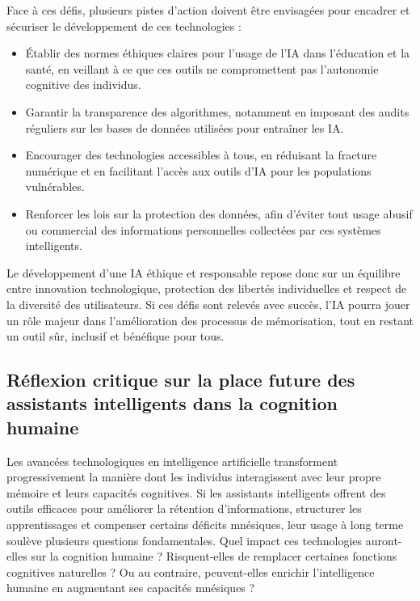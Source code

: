\documentclass[11pt,a4paper]{report}
\begin{document}
Face à ces défis, plusieurs pistes d’action doivent être envisagées pour encadrer et sécuriser le développement de ces technologies :

\begin{itemize}

    \item Établir des normes éthiques claires pour l’usage de l’IA dans l’éducation et la santé, en veillant à ce que ces outils ne compromettent pas l’autonomie cognitive des individus.

    \item Garantir la transparence des algorithmes, notamment en imposant des audits réguliers sur les bases de données utilisées pour entraîner les IA.

    \item Encourager des technologies accessibles à tous, en réduisant la fracture numérique et en facilitant l’accès aux outils d’IA pour les populations vulnérables.

    \item Renforcer les lois sur la protection des données, afin d’éviter tout usage abusif ou commercial des informations personnelles collectées par ces systèmes intelligents.

\end{itemize}

Le développement d’une IA éthique et responsable repose donc sur un équilibre entre innovation technologique, protection des libertés individuelles et respect de la diversité des utilisateurs. Si ces défis sont relevés avec succès, l’IA pourra jouer un rôle majeur dans l’amélioration des processus de mémorisation, tout en restant un outil sûr, inclusif et bénéfique pour tous.

\subsection{Réflexion critique sur la place future des assistants intelligents dans la cognition humaine}

Les avancées technologiques en intelligence artificielle transforment progressivement la manière dont les individus interagissent avec leur propre mémoire et leurs capacités cognitives. Si les assistants intelligents offrent des outils efficaces pour améliorer la rétention d’informations, structurer les apprentissages et compenser certains déficits mnésiques, leur usage à long terme soulève plusieurs questions fondamentales. Quel impact ces technologies auront-elles sur la cognition humaine ? Risquent-elles de remplacer certaines fonctions cognitives naturelles ? Ou au contraire, peuvent-elles enrichir l’intelligence humaine en augmentant ses capacités mnésiques ?
\end{document}
